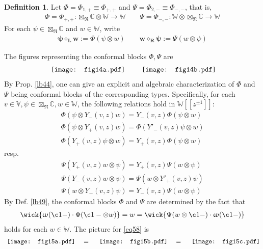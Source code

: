 \documentclass[11pt,b5paper,notitlepage]{article}
\theoremstyle{definition}
\newtheorem{df}{Definition}[section]
\theoremstyle{plain}
\newcommand{\Vbb}{\mathbb V}
\newcommand{\Wbb}{\mathbb W}
\newcommand{\Cbb}{\mathbb C}
\newcommand{\<}{\left\langle}
\renewcommand{\>}{\right\rangle}
\newcommand{\fn}{\mathfrak{N}}
\numberwithin{equation}{section}
\begin{document}
\begin{df}
Let $\Phi=\Phi_{1,+}\equiv\Phi_{+,+}$ and $\Psi=\Phi_{2,-}\equiv\Phi_{-,-}$, that is, 
\begin{gather}
   \Phi=\Phi_{+,+}:\boxtimes_\fn\Cbb\otimes \Wbb\rightarrow \Wbb\qquad 
   \Psi=\Phi_{-,-}:\Wbb\otimes \boxtimes_\fn\Cbb\rightarrow \Wbb
\end{gather}
For each $\psi\in \boxtimes_\fn\Cbb$ and $w\in \Wbb$, write 
\begin{align}\label{eq38}
   \pmb{\psi\diamond_L w}:=\Phi(\psi\otimes w) \qquad \pmb{w\diamond_R \psi}:=\Psi(w\otimes \psi)
\end{align}
\end{df}

The figures representing the conformal blocks $\Phi,\Psi$ are
\begin{align}\label{eq123}
   \vcenter{\hbox{{
		\texttt{[image: fig14a.pdf]}}}}\qquad \vcenter{\hbox{{
		   \texttt{[image: fig14b.pdf]}}}}
\end{align}
By Prop. \ref{lb44}, one can give an explicit and algebraic characterization of $\Phi$ and $\Psi$ being conformal blocks of the corresponding types. Specifically, for each $v\in \Vbb, \psi\in \boxtimes_\fn\Cbb,w\in \Wbb$, the following relations hold in $\Wbb[[z^{\pm1}]]$:
 \begin{gather*}
	\Phi(\psi\otimes Y_-(v,z)w)=Y_-(v,z)\Phi(\psi\otimes w)\\
\Phi(\psi\otimes Y_+(v,z)w)=\Phi(Y'_-(v,z)\psi\otimes w)\\
	\Phi(Y_+(v,z)\psi\otimes w)=Y_+(v,z)\Phi(\psi\otimes w)
 \end{gather*}
 resp. 
 \begin{gather*}
\Psi(Y_+(v,z)w\otimes \psi)=Y_+(v,z)\Psi(w\otimes\psi)\\
\Psi(Y_-(v,z)w\otimes \psi)=\Psi(w\otimes Y'_+(v,z)\psi)\\
	\Psi(w\otimes Y_-(v,z)\psi)=Y_-(v,z)\Psi(w\otimes \psi)
 \end{gather*}
By Def. \ref{lb49}, the conformal blocks $\Phi$ and $\Psi$ are determined by the fact that
\begin{gather}\label{eq58}
\wick{\upomega(\c1 -)\cdot\Phi(\c1 -\otimes w)}=w=\wick{\Psi(w\otimes \c1 -)\cdot \upomega(\c1 -)}
\end{gather}
holds for each $w\in\Wbb$. The picture for \eqref{eq58} is
\begin{gather}\label{eq34}
   \vcenter{\hbox{{
		\texttt{[image: fig15a.pdf]}}}}\quad=\quad\vcenter{\hbox{{
		   \texttt{[image: fig15b.pdf]}}}}\quad=\quad\vcenter{\hbox{{
			   \texttt{[image: fig15c.pdf]}}}}
\end{gather}
\end{document}
